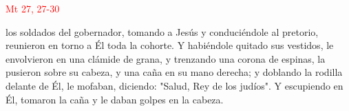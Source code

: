 \hfill\textcolor{red}{Mt 27, 27-30}

los soldados del gobernador, tomando a Jesús y conduciéndole al pretorio, reunieron en torno a Él toda la cohorte. 
Y habiéndole quitado sus vestidos, le envolvieron en una clámide de grana, y trenzando una corona de espinas, la pusieron sobre su cabeza, 
y una caña en su mano derecha; y doblando la rodilla delante de Él, le mofaban, diciendo: "Salud, Rey de los judíos". Y escupiendo en Él, 
tomaron la caña y le daban golpes en la cabeza.